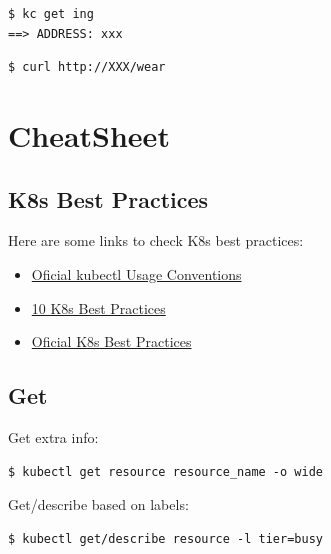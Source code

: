 \documentclass{article}
\newenvironment{codetemplate}[1][]{%
  \mybasecolorbox[#1]
  \itshape
}{%
  \endmybasecolorbox
}
\begin{document}
\begin{codetemplate}{}
\begin{verbatim}
$ kc get ing
==> ADDRESS: xxx
\end{verbatim}
\end{codetemplate}

\begin{codetemplate}{}
\begin{verbatim}
$ curl http://XXX/wear
\end{verbatim}
\end{codetemplate}

\newpage
\section{CheatSheet}
\subsection{K8s Best Practices}

Here are some links to check K8s best practices:

\begin{itemize}
    \item \href{https://kubernetes.io/docs/reference/kubectl/conventions/}{Oficial kubectl Usage Conventions}
    \item \href{https://www.densify.com/kubernetes-tools/kubernetes-best-practices/}{10 K8s Best Practices}
    \item \href{https://kubernetes.io/docs/concepts/configuration/overview/}{Oficial K8s Best Practices}
\end{itemize}

\subsection{Get}
Get extra info:
\begin{codetemplate}{}
\begin{verbatim}
$ kubectl get resource resource_name -o wide
\end{verbatim}
\end{codetemplate}

Get/describe based on labels:
\begin{codetemplate}{}
\begin{verbatim}
$ kubectl get/describe resource -l tier=busy
\end{verbatim}
\end{codetemplate}
\end{document}
